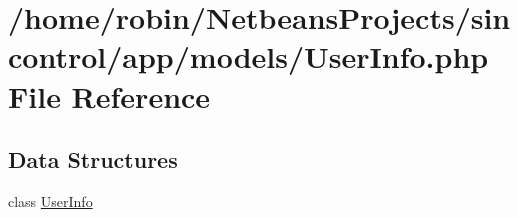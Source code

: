 \hypertarget{_user_info_8php}{}\section{/home/robin/\+Netbeans\+Projects/sincontrol/app/models/\+User\+Info.php File Reference}
\label{_user_info_8php}
\subsection*{Data Structures}
\begin{DoxyCompactItemize}
\item 
class \hyperlink{class_user_info}{User\+Info}
\end{DoxyCompactItemize}
